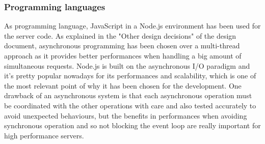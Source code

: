 \subsubsection{Programming languages}
As programming language, JavaScript in a Node.js environment has been used for the server code. As explained in the "Other design decisions" of the design document, asynchronous programming has been chosen over a multi-thread approach as it provides better performances when handling a big amount of simultaneous requests. Node.js is built on the asynchronous I/O paradigm and it's pretty popular nowadays for its performances and scalability, which is one of the most relevant point of why it has been chosen for the development. One drawback of an asynchronous system is that each asynchronous operation must be coordinated with the other operations with care and also tested accurately to avoid unexpected behaviours, but the benefits in performances when avoiding synchronous operation and so not blocking the event loop are really important for high performance servers.

